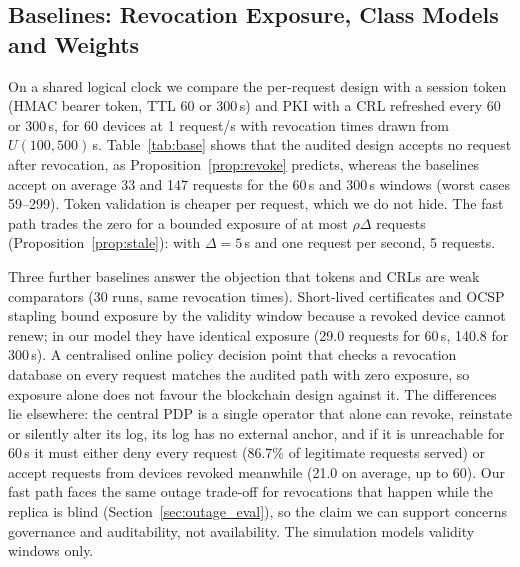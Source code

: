 \subsection{Baselines: Revocation Exposure, Class Models and Weights}\label{sec:baselines}
On a shared logical clock we compare the per-request design with a session token (HMAC bearer token, TTL 60 or 300\,s) and PKI with a CRL refreshed every 60 or 300\,s, for 60 devices at 1 request/s with revocation times drawn from $U(100,500)$\,s. Table~\ref{tab:base} shows that the audited design accepts no request after revocation, as Proposition~\ref{prop:revoke} predicts, whereas the baselines accept on average 33 and 147 requests for the 60\,s and 300\,s windows (worst cases 59--299). Token validation is cheaper per request, which we do not hide. The fast path trades the zero for a bounded exposure of at most $\rho\Delta$ requests (Proposition~\ref{prop:stale}): with $\Delta=5$\,s and one request per second, 5 requests.

\begin{table}[t]
\centering
\caption{Revocation exposure (requests accepted after revocation; 60 devices, 1 req/s) and mean decision latency}
\label{tab:base}
\scriptsize

\end{table}

Three further baselines answer the objection that tokens and CRLs are weak comparators (30 runs, same revocation times). Short-lived certificates and OCSP stapling bound exposure by the validity window because a revoked device cannot renew; in our model they have identical exposure (29.0 requests for 60\,s, 140.8 for 300\,s). A centralised online policy decision point that checks a revocation database on every request matches the audited path with zero exposure, so exposure alone does not favour the blockchain design against it. The differences lie elsewhere: the central PDP is a single operator that alone can revoke, reinstate or silently alter its log, its log has no external anchor, and if it is unreachable for 60\,s it must either deny every request (86.7\% of legitimate requests served) or accept requests from devices revoked meanwhile (21.0 on average, up to 60). Our fast path faces the same outage trade-off for revocations that happen while the replica is blind (Section~\ref{sec:outage_eval}), so the claim we can support concerns governance and auditability, not availability. The simulation models validity windows only.

